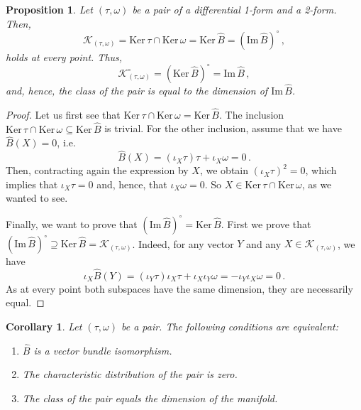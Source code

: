 \documentclass[11pt,twoside]{article}
\theoremstyle{plain}
\newtheorem{proposition}[theorem]{Proposition}
\newtheorem{corollary}[theorem]{Corollary}
\theoremstyle{definition}
\newcommand*{\inn}[1]{\iota_{#1}}
\def\Im{\mathrm{Im \,}}
\def\Ker{\mathrm{Ker \,}}
\def\K{\mathcal{K}}
\begin{document}
\begin{proposition}\label{prop:kernel_B}
Let $(\tau,\omega)$ be a pair of a differential 1-form and a 2-form. 
Then,
    $$\K_{(\tau,\omega)}=\Ker\tau \cap \Ker \omega = \Ker \widehat B = (\Im \widehat B)^{\circ}\,,$$
    holds at every point.
Thus,
$$\K_{(\tau,\omega)}^{\circ} =( \Ker \widehat B)^{\circ}=\Im \widehat B \,,$$
and, hence, the class of the pair is equal to the dimension of $\Im \widehat B$.
\end{proposition}
\begin{proof}
    Let us first see that $\Ker \tau \cap \Ker \omega =\Ker \widehat B$. The inclusion $\Ker \tau \cap \Ker \omega \subseteq\Ker \widehat B$ is trivial. For the other inclusion, assume that we have $\widehat B(X)=0$, i.e.\ 
    $$\widehat B(X)=(\inn{X} \tau)\tau +\inn{X}\omega = 0\,.$$
    Then, contracting again the expression by $X$, we obtain $(\inn{X} \tau)^2 = 0$, which implies that $\inn{X} \tau = 0$ and, hence, that $\inn{X} \omega = 0$. 
    So $X\in\Ker \tau \cap \Ker \omega$, as we wanted to see.

    Finally, we want to prove that $(\Im \widehat B)^{\circ} = \Ker \widehat B$. First we prove that $(\Im \widehat B)^{\circ} \supseteq \Ker \widehat B=\K_{(\tau,\omega)}$. Indeed, for any vector $Y$ and any $X\in \K_{(\tau,\omega)}$, we have
    $$\inn{X} \widehat B(Y) = (\inn{Y}\tau) \inn{X}\tau + \inn{X}\inn{Y}\omega =-\inn{Y}\inn{X}\omega = 0\,.$$
    As at every point both subspaces have the same dimension, they are necessarily equal.
\end{proof}

\begin{corollary}\label{cor:B_iso}
Let $(\tau,\omega)$ be a pair.
The following conditions are equivalent:
\begin{enumerate}[$(i)$]
\item 
$\widehat B$ is a vector bundle isomorphism.
\item 
The characteristic distribution of the pair is zero.
\item 
The class of the pair equals the dimension of the manifold.
\end{enumerate}
\end{corollary}
\end{document}
